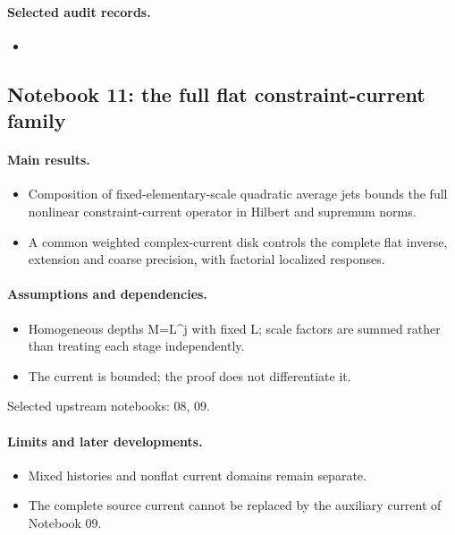 \documentclass[11pt]{article}
\theoremstyle{remark}
\begin{document}
\paragraph{Selected audit records.}
\begingroup\small
\begin{itemize}
\item {}
\end{itemize}
\endgroup

\subsection{Notebook 11: the full flat constraint-current family}
\label{hnc-11}
\noindent{}\par

\paragraph{Main results.}
\begin{itemize}
\item Composition of fixed-elementary-scale quadratic average jets bounds the full nonlinear constraint-current operator in Hilbert and supremum norms.
\item A common weighted complex-current disk controls the complete flat inverse, extension and coarse precision, with factorial localized responses.
\end{itemize}

\paragraph{Assumptions and dependencies.}
\begin{itemize}
\item Homogeneous depths M=L\textasciicircum{}j with fixed L; scale factors are summed rather than treating each stage independently.
\item The current is bounded; the proof does not differentiate it.
\end{itemize}

Selected upstream notebooks: 08, 09.\par

\paragraph{Limits and later developments.}
\begin{itemize}
\item Mixed histories and nonflat current domains remain separate.
\item The complete source current cannot be replaced by the auxiliary current of Notebook 09.
\end{itemize}
\end{document}
